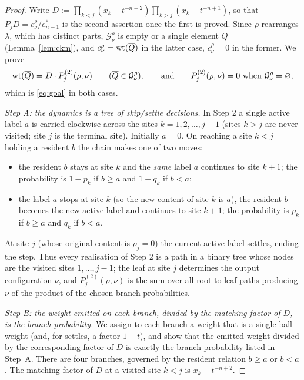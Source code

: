 \begin{proof}
Write $D:=\prod_{k<j}(x_k-t^{-n+2})\prod_{k>j}(x_k-t^{-n+1})$, so that $P_jD=
c^\rho_\nu/e^*_{n-1}$ is the second assertion once the first is proved. Since
$\rho$ rearranges $\lambda$, which has distinct parts, $\mathcal G^\rho_\nu$ is empty
or a single element $\overline Q$ (Lemma~\ref{lem:ckm}), and $c^\rho_\nu=\operatorname{wt}(\overline Q)$
in the latter case, $c^\rho_\nu=0$ in the former. We prove
\begin{equation}\label{eq:goal}
\operatorname{wt}(\overline Q)=D\cdot P^{(2)}_j(\rho,\nu)\qquad(\overline Q\in\mathcal G^\rho_\nu),
\qquad\text{and}\qquad P^{(2)}_j(\rho,\nu)=0\ \text{when}\ \mathcal G^\rho_\nu=\varnothing,
\end{equation}
which is \eqref{eq:goal} in both cases.

\medskip
\noindent\emph{Step A: the dynamics is a tree of skip/settle decisions.}
In Step 2 a single active label $a$ is carried clockwise across the sites
$k=1,2,\dots,j-1$ (sites $k>j$ are never visited; site $j$ is the terminal site).
Initially $a=0$. On reaching a site $k<j$ holding a resident $b$ the chain makes
one of two moves:
\begin{itemize}
\item[(\emph{skip})] the resident $b$ stays at site $k$ and the \emph{same} label
$a$ continues to site $k+1$; the probability is $1-p_k$ if $b\ge a$ and $1-q_k$
if $b<a$;
\item[(\emph{settle})] the label $a$ stops at site $k$ (so the new content of
site $k$ is $a$), the resident $b$ becomes the new active label and continues to
site $k+1$; the probability is $p_k$ if $b\ge a$ and $q_k$ if $b<a$.
\end{itemize}
At site $j$ (whose original content is $\rho_j=0$) the current active label
settles, ending the step. Thus every realisation of Step 2 is a path in a binary
tree whose nodes are the visited sites $1,\dots,j-1$; the leaf at site $j$
determines the output configuration $\nu$, and
$P^{(2)}_j(\rho,\nu)$ is the sum over all root-to-leaf paths producing $\nu$ of
the product of the chosen branch probabilities.

\medskip
\noindent\emph{Step B: the weight emitted on each branch, divided by the matching
factor of $D$, is the branch probability.}
We assign to each branch a weight that is a single ball weight (and, for
settles, a factor $1-t$), and show that the emitted weight divided by the
corresponding factor of $D$ is exactly the branch probability listed in Step~A.
There are four branches, governed by the resident relation $b\ge a$ or $b<a$.
The matching factor of $D$ at a visited site $k<j$ is $x_k-t^{-n+2}$.


\end{proof}
